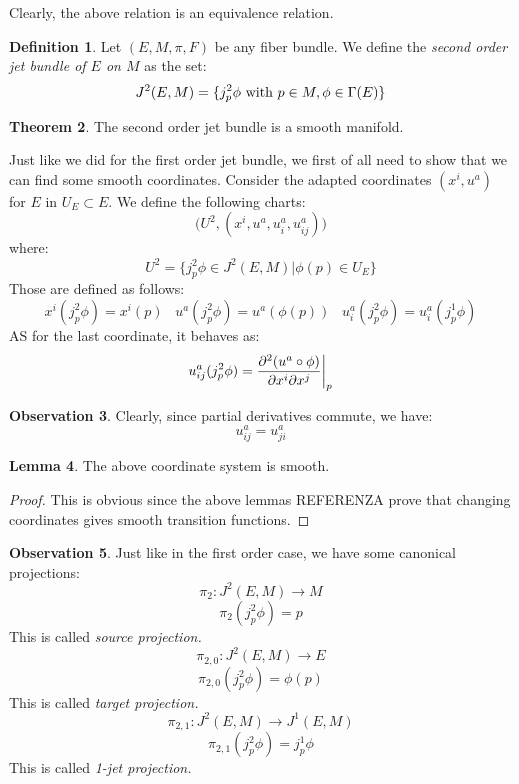 \documentclass[12pt,a4paper]{report}
\theoremstyle{definition}
\newtheorem{Def}{Definition}[chapter]
\theoremstyle{Theorem}
\newtheorem{Theo}[Def]{Theorem}
\newtheorem{Lm}[Def]{Lemma}
\theoremstyle{definition}
\theoremstyle{definition}
\newtheorem{Obs}[Def]{Observation}
\begin{document}
	Clearly, the above relation is an equivalence relation.
	\begin{Def}
		Let $(E,M,\pi,F)$ be any fiber bundle. We define the \textit{second order jet bundle of $E$ on $M$} as the set:
		$$J^2(E,M)=\{j^2_p\phi \hbox{ with }p\in M, \phi\in\Gamma(E)\}$$
	\end{Def}
	\begin{Theo}
		The second order jet bundle is a smooth manifold.
	\end{Theo}
	Just like we did for the first order jet bundle, we first of all need to show that we can find some smooth coordinates. Consider the adapted coordinates $(x^i,u^a)$ for $E$ in $U_E\subset E$. We define the following charts:
	$$\bigg(U^2,(x^i,u^a,u^a_i,u^a_{ij})\bigg)$$
	where: 
	$$U^2=\{j^2_p\phi\in J^2(E,M)\big|\phi(p)\in U_E\}$$
	Those are defined as follows:
	$$x^i(j^2_p\phi)=x^i(p)\hspace{10pt} u^a(j^2_p\phi)=u^a(\phi(p))\hspace{10pt}
	u^a_i(j^2_p\phi)=u^a_i(j^1_p\phi)$$
	AS for the last coordinate, it behaves as:
	$$u^a_{ij}(j^2_p\phi)={\partial^2 (u^a\circ \phi)\over \partial x^i \partial x^j}\bigg|_p$$
	\begin{Obs}
		Clearly, since partial derivatives commute, we have:
		$$u^a_{ij}=u^a_{ji}$$
	\end{Obs}
	\begin{Lm}
		The above coordinate system is smooth.
	\end{Lm}
	\begin{proof}
		This is obvious since the above lemmas REFERENZA prove that changing coordinates gives smooth transition functions.
	\end{proof}
	\begin{Obs}
		Just like in the first order case, we have some canonical projections:
		$$\pi_2:J^2(E,M)\longrightarrow M$$
		$$\pi_2(j^2_p\phi)=p$$
		This is called \textit{source projection.}
		$$\pi_{2,0}:J^2(E,M)\longrightarrow E$$
		$$\pi_{2,0}(j^2_p\phi)=\phi(p)$$
		This is called \textit{target projection.}
		$$\pi_{2,1}:J^2(E,M)\longrightarrow J^1(E,M)$$
		$$\pi_{2,1}(j^2_p\phi)=j^1_p\phi$$
		This is called \textit{1-jet projection.}
	\end{Obs}
	\begin{center}
	\end{center}
\end{document}
